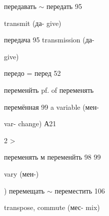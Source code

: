 \begin{minipage}[t]{0.475\textwidth}
\noindent передавать $\sim$ передать 95\par
\noindent transmit (да- give)\par
\noindent передача 95 transmission (да-\par
\noindent give)\par
\noindent передо = перед 52\par
\noindent переменйть pf. of переменять\par
\noindent перемённая 99 a variable (мен-\par
\noindent var- change) А21\par
{} 2 >\par
\noindent переменять м переменйть 98 99\par
\noindent vary (мен-)\par
\noindent ) перемещать $\sim$ переместить 106\par
\noindent transpose, commute (мес- mix)\par
\end{minipage}
\endgroup

